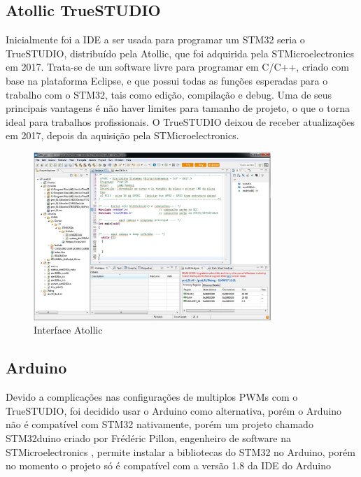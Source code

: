 
\subsection{Atollic TrueSTUDIO}

Inicialmente foi a IDE a ser usada para programar um STM32 seria o TrueSTUDIO, distribuído pela
Atollic, que foi adquirida pela STMicroelectronics em 2017. Trata-se de um
software livre para programar em C/C++, criado com base na plataforma Eclipse,
e que possui todas as funções esperadas para o trabalho com o STM32, tais como
edição, compilação e debug. Uma de seus principais vantagens é não haver
limites para tamanho de projeto, o que o torna ideal para trabalhos
profissionais. O TrueSTUDIO deixou de receber atualizações em 2017,
depois da aquisição pela STMicroelectronics.\cite{apostila_microprossados}

\begin{figure}[h]
	\centering
	\includegraphics[width=0.8\textwidth]{figures/atollic}
	\caption{Interface Atollic \cite{apostila_microprossados}}
\end{figure}


\subsection{Arduino}

Devido a complicações nas configurações de multiplos PWMs com o TrueSTUDIO, foi decidido usar o Arduino como alternativa,
porém o Arduino não é compatível com STM32 nativamente, porém um projeto chamado STM32duino \cite{STM32duino} criado por Frédéric Pillon, engenheiro de software na STMicroelectronics \cite{fpistm},
permite instalar a bibliotecas do STM32 no Arduino, porém no momento o projeto só é compatível com a versão 1.8 da IDE do Arduino


